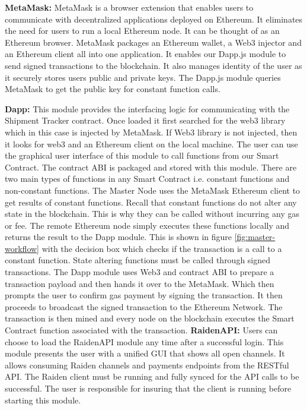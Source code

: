 \textbf{MetaMask:}
MetaMask is a browser extension that enables users to communicate with decentralized applications deployed on Ethereum. It eliminates the need for users to run a local Ethereum node. It can be thought of as an Ethereum browser. MetaMask packages an Ethereum wallet, a Web3 injector and an Ethereum client all into one application. It enables our Dapp.js module to send signed transactions to the blockchain. It also manages identity of the user as it securely stores users public and private keys. The Dapp.js module queries MetaMask to get the public key for constant function calls.

\textbf{Dapp:}
This module provides the interfacing logic for communicating with the Shipment Tracker contract. Once loaded it first searched for the web3 library which in this case is injected by MetaMask. If Web3 library is not injected, then it looks for web3 and an Ethereum client on the local machine. The user can use the graphical user interface of this module to call functions from our Smart Contract. The contract ABI is packaged and stored with this module. There are two main types of functions in any Smart Contract i.e. constant functions and non-constant functions. The Master Node uses the MetaMask Ethereum client to get results of constant functions. Recall that constant functions do not alter any state in the blockchain. This is why they can be called without incurring any gas or fee. The remote Ethereum node simply executes these functions locally and returns the result to the Dapp module. This is shown in figure \ref{fig:master-workflow} with the decision box which checks if the transaction is a call to a constant function. State altering functions must be called through signed transactions. The Dapp module uses Web3 and contract ABI to prepare a transaction payload and then hands it over to the MetaMask. Which then prompts the user to confirm gas payment by signing the transaction. It then proceeds to broadcast the signed transaction to the Ethereum Network. The transaction is then mined and every node on the blockchain executes the Smart Contract function associated with the transaction.
\textbf{RaidenAPI:}
Users can choose to load the RaidenAPI module any time after a successful login. This module presents the user with a unified GUI that shows all open channels. It allows consuming Raiden channels and payments endpoints from the RESTful API. The Raiden client must be running and fully synced for the API calls to be successful. The user is responsible for insuring that the client is running before starting this module. 

